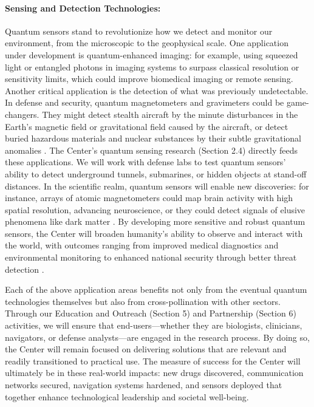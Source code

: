 \documentclass[12pt]{article}
\begin{document}
\paragraph{Sensing and Detection Technologies:} Quantum sensors stand to revolutionize how we detect and monitor our environment, from the microscopic to the geophysical scale. One application under development is quantum-enhanced imaging: for example, using squeezed light or entangled photons in imaging systems to surpass classical resolution or sensitivity limits, which could improve biomedical imaging or remote sensing. Another critical application is the detection of what was previously undetectable. In defense and security, quantum magnetometers and gravimeters could be game-changers. They might detect stealth aircraft by the minute disturbances in the Earth’s magnetic field or gravitational field caused by the aircraft, or detect buried hazardous materials and nuclear substances by their subtle gravitational anomalies . The Center’s quantum sensing research (Section 2.4) directly feeds these applications. We will work with defense labs to test quantum sensors’ ability to detect underground tunnels, submarines, or hidden objects at stand-off distances. In the scientific realm, quantum sensors will enable new discoveries: for instance, arrays of atomic magnetometers could map brain activity with high spatial resolution, advancing neuroscience, or they could detect signals of elusive phenomena like dark matter . By developing more sensitive and robust quantum sensors, the Center will broaden humanity’s ability to observe and interact with the world, with outcomes ranging from improved medical diagnostics and environmental monitoring to enhanced national security through better threat detection .



Each of the above application areas benefits not only from the eventual quantum technologies themselves but also from cross-pollination with other sectors. Through our Education and Outreach (Section 5) and Partnership (Section 6) activities, we will ensure that end-users—whether they are biologists, clinicians, navigators, or defense analysts—are engaged in the research process. By doing so, the Center will remain focused on delivering solutions that are relevant and readily transitioned to practical use. The measure of success for the Center will ultimately be in these real-world impacts: new drugs discovered, communication networks secured, navigation systems hardened, and sensors deployed that together enhance technological leadership and societal well-being.
\end{document}
